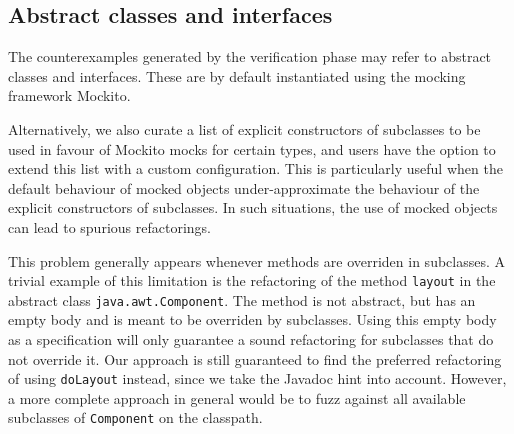 \documentclass[10pt,conference]{IEEEtran}
\begin{document}




\subsection{Abstract classes and interfaces}

The counterexamples generated by the verification phase may refer to
abstract classes and interfaces. These are by default instantiated
using the mocking framework Mockito.

Alternatively, we also curate a
list of explicit constructors
of subclasses to be used in favour of Mockito mocks for certain types, and users
have the option to extend this list with a custom configuration. This is
particularly useful when the default behaviour of mocked objects under-approximate
the behaviour of the explicit constructors of subclasses.
In such situations, the use of mocked objects can lead to
spurious refactorings.

This problem generally appears whenever methods are overriden in subclasses.
A trivial example of this limitation is the refactoring of the
method \texttt{layout} in the abstract class \texttt{java.awt.Component}. The
method is not abstract, but has an empty body and is meant to be overriden by
subclasses. Using this empty body as a specification will only guarantee a sound
refactoring for subclasses that do not override it. Our approach is still
guaranteed to find the preferred refactoring of using \texttt{doLayout} instead,
since we take the Javadoc hint into account. However, a more complete approach
in general would be to fuzz against all available subclasses of
\texttt{Component} on the classpath.
\end{document}
